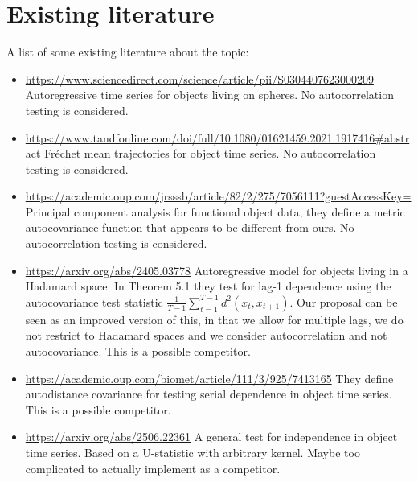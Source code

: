 \documentclass{article}
\begin{document}
\section{Existing literature}

A list of some existing literature about the topic:

\begin{itemize}
    \item \url{https://www.sciencedirect.com/science/article/pii/S0304407623000209} Autoregressive time series for objects living on spheres. No autocorrelation testing is considered.
    \item \url{https://www.tandfonline.com/doi/full/10.1080/01621459.2021.1917416#abstract} Fr{\'e}chet mean trajectories for object time series. No autocorrelation testing is considered.
    \item \url{https://academic.oup.com/jrsssb/article/82/2/275/7056111?guestAccessKey=} Principal component analysis for functional object data, they define a metric autocovariance function that appears to be different from ours. No autocorrelation testing is considered.
    \item \url{https://arxiv.org/abs/2405.03778} Autoregressive model for objects living in a Hadamard space. In Theorem 5.1 they test for lag-1 dependence using the autocovariance test statistic $\frac{1}{T - 1} \sum_{t = 1}^{T - 1} d^2(x_t, x_{t + 1})$. Our proposal can be seen as an improved version of this, in that we allow for multiple lags, we do not restrict to Hadamard spaces and we consider autocorrelation and not autocovariance. This is a possible competitor.
    \item \url{https://academic.oup.com/biomet/article/111/3/925/7413165} They define autodistance covariance for testing serial dependence in object time series. This is a possible competitor.
    \item \url{https://arxiv.org/abs/2506.22361} A general test for independence in object time series. Based on a U-statistic with arbitrary kernel. Maybe too complicated to actually implement as a competitor.
\end{itemize}


% 
% 
\end{document}
